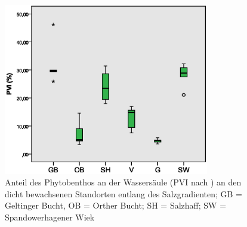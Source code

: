 \begin{figure}[!htb]
\centering
\includegraphics[width=0.80\textwidth]{images/pvi/pvi_salzgradient.eps}
\caption[PVI an Standorten entlang des Salzgradienten]{Anteil des Phytobenthos an der Wassersäule (PVI nach \cite{jeppesen_1998}) an den dicht bewachsenen Standorten entlang des Salzgradienten; GB = Geltinger Bucht, OB = Orther Bucht; SH = Salzhaff; SW = Spandowerhagener Wiek}
\label{fig:pvi_salzgradient}
\end{figure}



